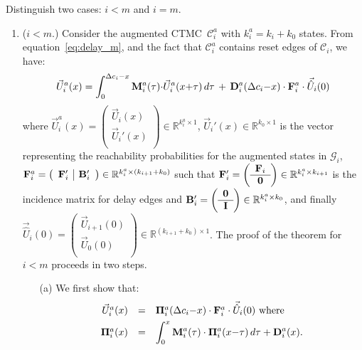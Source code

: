 \documentclass{LMCS}
\newcommand{\mc}[1]{\mathcal{#1}}
\newcommand{\<}{\langle}
\renewcommand{\>}{\rangle}
\newcommand{\CTMC}{\textsc{{CTMC}}}
\newcommand{\bdD}{{\bf D}}
\newcommand{\bdF}{{\bf F}}
\newcommand{\bdB}{{\bf B}}
\newcommand{\bdM}{{\bf M}}
\newcommand{\bdPi}{\mathbf{\Pi}}
\newcommand{\Reals}{\mathbb{R}}
\begin{document}
\proof
Distinguish two cases: $i < m$ and $i = m$.
\begin{enumerate}[(1)]
\item ($i <m $.)
Consider the augmented \CTMC\ $\mc{C}_i^a$ with $k_i^a=k_i+k_0$ states.
From equation~\eqref{eq:delay_m}, and the fact that $\mc{C}_i^a$ contains
reset edges of $\mc{C}_i$, we have:
\[
\vec{U}_i^a(x)= \int_{0}^{\Delta c_i{-}x} \bdM_i^a(\tau){\cdot}\vec{U}_i^a(x{+}\tau) \, d\tau \, + \,
\bdD_i^a(\Delta c_i{-}x)\cdot \bdF_i^a \cdot \vec{\hat U}_i(0)
\]
where $\vec{U}_i^a(x) = \left(\begin{array}{c} \vec{U}_i(x)\\ \hline \vec{U}_i'(x) \\
\end{array}\right) \in\Reals^{k_i^a \times 1}$, $\vec{U}_i'(x)\in\Reals^{k_0\times1}$ is
the vector representing the reachability probabilities for the augmented states in $\mc{G}_i$,
$\bdF_i^a=\left(\begin{array}{c|c}{\bdF'_i}&{\bdB'_i}\end{array}
\right)\in\Reals^{k_i^a\times(k_{i+1}+k_0)}$ such that
$\bdF'_i=\left(\begin{array}{c}
\bdF_i\\ \hline \mathbf{0}\\\end{array}\right)\in\Reals^{k_i^a\times k_{i+1}}$
is the incidence matrix for delay edges and $\bdB'_i=\left(\begin{array}{c}
\mathbf{0}\\ \hline \mathbf{I}\\\end{array}\right)\in\Reals^{k_i^a\times k_0}$, and finally
$\vec{\hat U}_i(0)=\left(\begin{array}{c}
\vec{U}_{i+1}(0)\\ \hline
\vec{U}_{0}(0)\\\end{array}\right)\in\Reals^{(k_{i+1}+k_0)\times 1}$.
\noindent
The proof of the theorem for $i < m$ proceeds in two steps.
\begin{enumerate}[(a)]
\item[(a)]
We first show that:
$$
\begin{array}{rcl}
\vec{U}_i^a(x) & = & \bdPi_i^a(\Delta c_i{-}x)\cdot\bdF_i^a\cdot\vec{\hat U}_i(0) \mbox{ where } \\[1ex]
\bdPi_i^a(x) & = & \displaystyle \int_{0}^{x}\bdM_i^a(\tau)\cdot \bdPi_i^a(x{-}\tau) \, d\tau + \bdD_i^a(x).
\end{array}
$$
\end{enumerate}
\end{enumerate}
\end{document}
